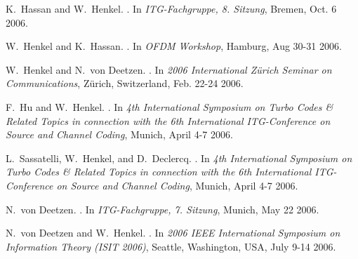  \begin{bibunit}[hplain]\begin{thebibliography}{1}

K.~Hassan and W.~Henkel.
.
\newblock In {\em ITG-Fachgruppe, 8. Sitzung}, Bremen, Oct. 6 2006.

W.~Henkel and K.~Hassan.
.
\newblock In {\em OFDM Workshop}, Hamburg, Aug 30-31 2006.

W.~Henkel and N.~von Deetzen.
.
\newblock In {\em 2006 International Z\"urich Seminar on Communications},
  Z\"urich, Switzerland, Feb. 22-24 2006.

F.~Hu and W.~Henkel.
.
\newblock In {\em 4th International Symposium on Turbo Codes \& Related Topics
  in connection with the 6th International ITG-Conference on Source and Channel
  Coding}, Munich, April 4-7 2006.

L.~Sassatelli, W.~Henkel, and D.~Declercq.
.
\newblock In {\em 4th International Symposium on Turbo Codes \& Related Topics
  in connection with the 6th International ITG-Conference on Source and Channel
  Coding}, Munich, April 4-7 2006.

N.~von Deetzen.
.
\newblock In {\em ITG-Fachgruppe, 7. Sitzung}, Munich, May 22 2006.

N.~von Deetzen and W.~Henkel.
.
\newblock In {\em 2006 IEEE International Symposium on Information Theory (ISIT
  2006)}, Seattle, Washington, USA, July 9-14 2006.

\end{thebibliography}
\end{bibunit}